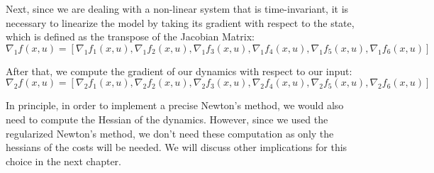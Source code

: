 Next, since we are dealing with a non-linear system that is time-invariant, it is necessary to linearize the model by taking its gradient with respect to the state, which is defined as the transpose of the Jacobian Matrix:
\[
    \nabla_1 f(x,u) = \left[\nabla_1 f_1(x,u), \nabla_1 f_2(x,u), \nabla_1 f_3(x,u), \nabla_1 f_4(x,u), \nabla_1 f_5(x,u), \nabla_1 f_6(x,u)\right]
\]

After that, we compute the gradient of our dynamics with respect to our input:
\[
    \nabla_2 f(x,u) = [\nabla_2 f_1(x,u), \nabla_2 f_2(x,u), \nabla_2 f_3(x,u), \nabla_2 f_4(x,u), \nabla_2 f_5(x,u), \nabla_2 f_6(x,u)]
\]

In principle, in order to implement a precise Newton's method, we would also need to compute the Hessian of the dynamics. However, since we used the regularized Newton's method, we don't need these computation as only the hessians of the costs will be needed. We will discuss other implications for this choice in the next chapter. 